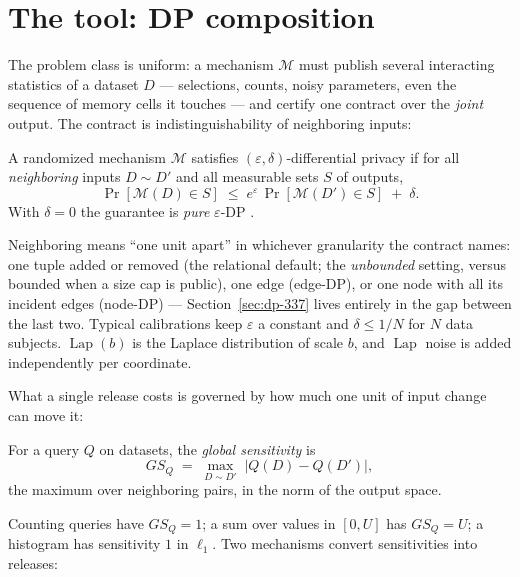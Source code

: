 \section{The tool: DP composition}
\label{sec:dp-tool}

The problem class is uniform: a mechanism $\mathcal{M}$ must publish several interacting
statistics of a dataset $D$ --- selections, counts, noisy parameters, even the sequence of
memory cells it touches --- and certify one contract over the \emph{joint} output. The
contract is indistinguishability of neighboring inputs:

\begin{definition}\label{def:dp-dp}
A randomized mechanism $\mathcal{M}$ satisfies $(\varepsilon,\delta)$-differential
privacy if for all \emph{neighboring} inputs $D \sim D'$ and all measurable sets $S$ of
outputs,
\[
\Pr[\mathcal{M}(D) \in S] \;\le\; e^{\varepsilon}\,\Pr[\mathcal{M}(D') \in S] \;+\; \delta .
\]
With $\delta = 0$ the guarantee is \emph{pure} $\varepsilon$-DP
\citep{dp-composition-bg1,dp-composition-bg3}.
\end{definition}

\begin{remarkbox}[Notation]
Neighboring means ``one unit apart'' in whichever granularity the contract names: one
tuple added or removed (the relational default; the \emph{unbounded} setting, versus
bounded when a size cap is public), one edge (edge-DP), or one node with all its incident
edges (node-DP) --- Section~\ref{sec:dp-337} lives entirely in the gap between the last
two. Typical calibrations keep $\varepsilon$ a constant and $\delta \le 1/N$ for $N$ data
subjects. $\operatorname{Lap}(b)$ is the Laplace distribution of scale $b$, and
$\operatorname{Lap}$ noise is added independently per coordinate.
\end{remarkbox}

What a single release costs is governed by how much one unit of input change can move it:

\begin{definition}\label{def:dp-sens}
For a query $Q$ on datasets, the \emph{global sensitivity} is
\[
GS_Q \;=\; \max_{D \sim D'} \;\bigl|Q(D) - Q(D')\bigr|,
\]
the maximum over neighboring pairs, in the norm of the output space.
\end{definition}

Counting queries have $GS_Q = 1$; a sum over values in $[0,U]$ has $GS_Q = U$; a
histogram has sensitivity $1$ in $\ell_1$. Two mechanisms convert sensitivities into
releases:

